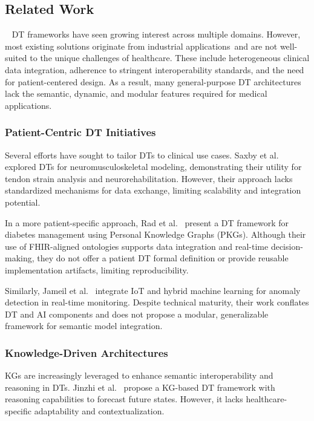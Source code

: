 \subsection{Related Work}~\label{sec:paper6_related_work}
DT frameworks have seen growing interest across multiple domains. However, most existing solutions originate from industrial applications~\cite{wang_mobility_2022}and are not well-suited to the unique challenges of healthcare. These include heterogeneous clinical data integration, adherence to stringent interoperability standards, and the need for patient-centered design. As a result, many general-purpose DT architectures lack the semantic, dynamic, and modular features required for medical applications.
%
\subsubsection{Patient-Centric DT Initiatives}
Several efforts have sought to tailor DTs to clinical use cases. Saxby et al.~\cite{saxby_digital_2023} explored DTs for neuromusculoskeletal modeling, demonstrating their utility for tendon strain analysis and neurorehabilitation. However, their approach lacks standardized mechanisms for data exchange, limiting scalability and integration potential.

In a more patient-specific approach, Rad et al.~\cite{sarani_rad_personalized_2024} present a DT framework for diabetes management using Personal Knowledge Graphs (PKGs). Although their use of FHIR-aligned ontologies supports data integration and real-time decision-making, they do not offer a patient DT formal definition or provide reusable implementation artifacts, limiting reproducibility.

Similarly, Jameil et al.~\cite{jameil_digital_2025} integrate IoT and hybrid machine learning for anomaly detection in real-time monitoring. Despite technical maturity, their work conflates DT and AI components and does not propose a modular, generalizable framework for semantic model integration.
%
\subsubsection{Knowledge-Driven Architectures}
KGs are increasingly leveraged to enhance semantic interoperability and reasoning in DTs. Jinzhi et al.~\cite{jinzhi_exploring_2022} propose a KG-based DT framework with reasoning capabilities to forecast future states. However, it lacks healthcare-specific adaptability and contextualization.

